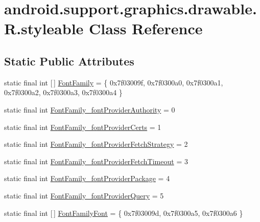 \hypertarget{classandroid_1_1support_1_1graphics_1_1drawable_1_1R_1_1styleable}{}\section{android.\+support.\+graphics.\+drawable.\+R.\+styleable Class Reference}
\label{classandroid_1_1support_1_1graphics_1_1drawable_1_1R_1_1styleable}
\subsection*{Static Public Attributes}
\begin{DoxyCompactItemize}
\item 
static final int \mbox{[}$\,$\mbox{]} \mbox{\hyperlink{classandroid_1_1support_1_1graphics_1_1drawable_1_1R_1_1styleable_a9ed3605c9a5b186c41ead69f54c97e35}{Font\+Family}} = \{ 0x7f03009f, 0x7f0300a0, 0x7f0300a1, 0x7f0300a2, 0x7f0300a3, 0x7f0300a4 \}
\item 
static final int \mbox{\hyperlink{classandroid_1_1support_1_1graphics_1_1drawable_1_1R_1_1styleable_aea009661a604f345f5f66daa64172993}{Font\+Family\+\_\+font\+Provider\+Authority}} = 0
\item 
static final int \mbox{\hyperlink{classandroid_1_1support_1_1graphics_1_1drawable_1_1R_1_1styleable_a6f2bea77d90c424651ecdf3d423befb4}{Font\+Family\+\_\+font\+Provider\+Certs}} = 1
\item 
static final int \mbox{\hyperlink{classandroid_1_1support_1_1graphics_1_1drawable_1_1R_1_1styleable_a94537eb07253581f3ef7233741bdaf42}{Font\+Family\+\_\+font\+Provider\+Fetch\+Strategy}} = 2
\item 
static final int \mbox{\hyperlink{classandroid_1_1support_1_1graphics_1_1drawable_1_1R_1_1styleable_aa7d600c6df12eafcaeb73bfebb45daad}{Font\+Family\+\_\+font\+Provider\+Fetch\+Timeout}} = 3
\item 
static final int \mbox{\hyperlink{classandroid_1_1support_1_1graphics_1_1drawable_1_1R_1_1styleable_a2d0213f333dc2c6a46402411768b63a3}{Font\+Family\+\_\+font\+Provider\+Package}} = 4
\item 
static final int \mbox{\hyperlink{classandroid_1_1support_1_1graphics_1_1drawable_1_1R_1_1styleable_ab2b08f0a8aed25117fb484a9b644f055}{Font\+Family\+\_\+font\+Provider\+Query}} = 5
\item 
static final int \mbox{[}$\,$\mbox{]} \mbox{\hyperlink{classandroid_1_1support_1_1graphics_1_1drawable_1_1R_1_1styleable_a60726145e283b8c41f38ab12dc70cfa0}{Font\+Family\+Font}} = \{ 0x7f03009d, 0x7f0300a5, 0x7f0300a6 \}

\end{DoxyCompactItemize}

